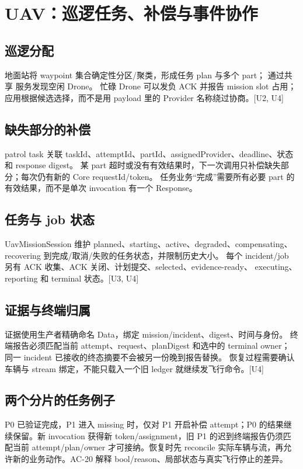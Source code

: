 \newpage

\section{UAV：巡逻任务、补偿与事件协作}
\subsection{巡逻分配}
地面站将 waypoint 集合确定性分区/聚类，形成任务 plan 与多个 part；
通过共享  服务发现空闲 Drone。
忙碌 Drone 可以发负 ACK 并报告 mission slot 占用；应用根据候选选择，而不是用 payload
里的 Provider 名称绕过协商。[U2, U4]

\subsection{缺失部分的补偿}
patrol task 关联 taskId、attemptId、partId、assignedProvider、deadline、状态和 response digest。
某 part 超时或没有有效结果时，下一次调用只补偿缺失部分；每次仍有新的 Core requestId/token。
任务业务“完成”需要所有必要 part 的有效结果，而不是单次 invocation 有一个 Response。

\subsection{任务与 job 状态}
UavMissionSession 维护 planned、starting、active、degraded、compensating、recovering
到完成/取消/失败的任务状态，并限制历史大小。
每个 incident/job 另有 ACK 收集、ACK 关闭、计划提交、selected、evidence-ready、
executing、reporting 和 terminal 状态。[U3, U4]

\subsection{证据与终端归属}
证据使用生产者精确命名 Data，绑定 mission/incident、digest、时间与身份。
终端报告必须匹配当前 attempt、request、planDigest 和选中的 terminal owner；
同一 incident 已接收的终态摘要不会被另一份晚到报告替换。
恢复过程需要确认车辆与 stream 绑定，不能只载入一个旧 ledger 就继续发飞行命令。[U4]



\subsection{两个分片的任务例子}
P0 已验证完成，P1 进入 missing 时，仅对 P1 开启补偿 attempt；P0 的结果继续保留。新 invocation 获得新 token/assignment，旧 P1 的迟到终端报告仍须匹配当前 attempt/plan/owner 才可接纳。恢复时先 reconcile 实际车辆与流，再允许新的业务动作。AC-20 解释 bool/reason、局部状态与真实飞行停止的差异。

